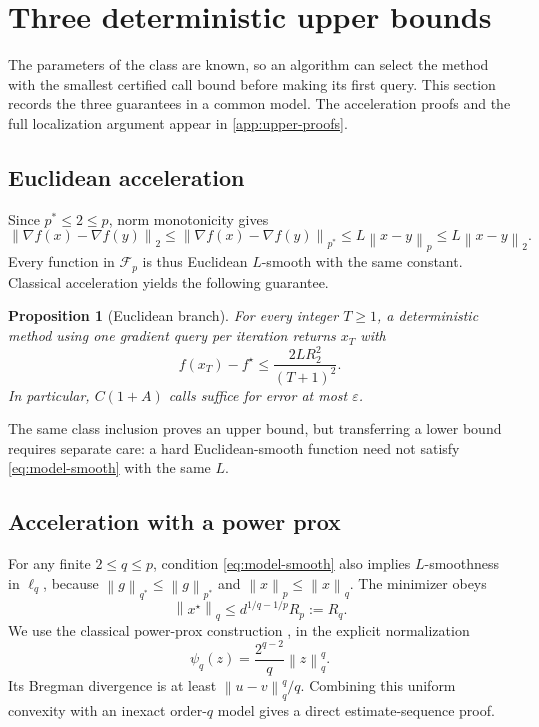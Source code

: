 \documentclass[11pt]{article}
\newcommand{\cF}{\mathcal{F}}
\newcommand{\norm}[2]{\left\lVert #1\right\rVert_{#2}}
\newcommand{\eps}{\varepsilon}
\newcommand{\defeq}{\mathrel{:=}}
\newtheorem{proposition}[proposition]{Proposition}
\theoremstyle{definition}
\theoremstyle{remark}
\begin{document}
\section{Three deterministic upper bounds}
\label{sec:upper}

The parameters of the class are known, so an algorithm can select the
method with the smallest certified call bound before making its first
query. This section records the three guarantees in a common model.
The acceleration proofs and the full localization argument appear in
\cref{app:upper-proofs}.

\subsection{Euclidean acceleration}

Since $p^*\le2\le p$, norm monotonicity gives
\begin{equation}
\label{eq:p-implies-euclidean}
 \norm{\nabla f(x)-\nabla f(y)}{2}
 \le\norm{\nabla f(x)-\nabla f(y)}{p^*}
 \le L\norm{x-y}{p}
 \le L\norm{x-y}{2}.
\end{equation}
Every function in $\cF_p$ is thus Euclidean $L$-smooth with the same
constant. Classical acceleration yields the following guarantee.

\begin{proposition}[Euclidean branch]
\label{prop:euclidean}
For every integer $T\ge1$, a deterministic method using one gradient
query per iteration returns $x_T$ with
\begin{equation}
\label{eq:euclidean-error}
 f(x_T)-f^\star\le\frac{2LR_2^2}{(T+1)^2}.
\end{equation}
In particular, $C(1+A)$ calls suffice for error at most $\eps$.
\end{proposition}

The same class inclusion proves an upper bound, but transferring a
lower bound requires separate care: a hard Euclidean-smooth function
need not satisfy \cref{eq:model-smooth} with the same $L$.

\subsection{Acceleration with a power prox}

For any finite $2\le q\le p$, condition \cref{eq:model-smooth} also
implies $L$-smoothness in $\ell_q$, because
$\norm{g}{q^*}\le\norm{g}{p^*}$ and $\norm{x}{p}\le\norm{x}{q}$.
The minimizer obeys
\begin{equation}
\label{eq:Rq}
 \norm{x^\star}{q}\le d^{1/q-1/p}R_p\defeq R_q.
\end{equation}
We use the classical power-prox construction
\citep{dAspremontGuzmanJaggi2018}, in the explicit normalization
\begin{equation}
\label{eq:power-prox}
 \psi_q(z)=\frac{2^{q-2}}{q}\norm{z}{q}^q.
\end{equation}
Its Bregman divergence is at least $\norm{u-v}{q}^q/q$.
Combining this uniform convexity with an inexact order-$q$ model gives
a direct estimate-sequence proof.
\end{document}
